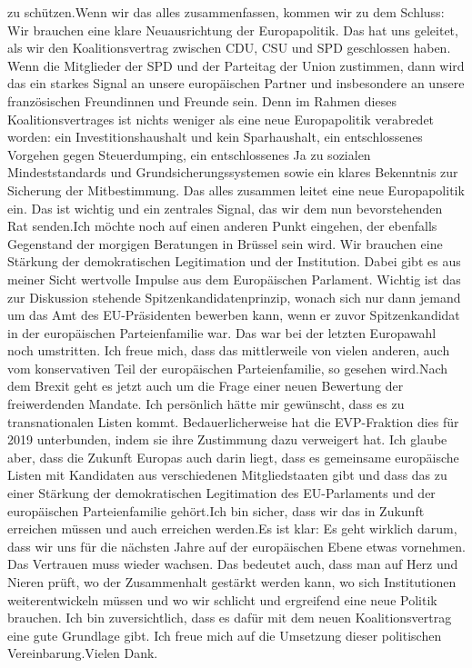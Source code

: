 \documentclass{article}
\begin{document}
zu schützen.Wenn wir das alles zusammenfassen, kommen wir zu dem Schluss: Wir brauchen eine klare Neuausrichtung der Europapolitik. Das hat uns geleitet, als wir den Koalitionsvertrag zwischen CDU, CSU und SPD geschlossen haben. Wenn die Mitglieder der SPD und der Parteitag der Union zustimmen, dann wird das ein starkes Signal an unsere europäischen Partner und insbesondere an unsere französischen Freundinnen und Freunde sein. Denn im Rahmen dieses Koalitionsvertrages ist nichts weniger als eine neue Europapolitik verabredet worden: ein Investitionshaushalt und kein Sparhaushalt, ein entschlossenes Vorgehen gegen Steuerdumping, ein entschlossenes Ja zu sozialen Mindeststandards und Grundsicherungssystemen sowie ein klares Bekenntnis zur Sicherung der Mitbestimmung. Das alles zusammen leitet eine neue Europapolitik ein. Das ist wichtig und ein zentrales Signal, das wir dem nun bevorstehenden Rat senden.Ich möchte noch auf einen anderen Punkt eingehen, der ebenfalls Gegenstand der morgigen Beratungen in Brüssel sein wird. Wir brauchen eine Stärkung der demokratischen Legitimation und der Institution. Dabei gibt es aus meiner Sicht wertvolle Impulse aus dem Europäischen Parlament. Wichtig ist das zur Diskussion stehende Spitzenkandidatenprinzip, wonach sich nur dann jemand um das Amt des EU-Präsidenten bewerben kann, wenn er zuvor Spitzenkandidat in der europäischen Parteienfamilie war. Das war bei der letzten Europawahl noch umstritten. Ich freue mich, dass das mittlerweile von vielen anderen, auch vom konservativen Teil der europäischen Parteienfamilie, so gesehen wird.Nach dem Brexit geht es jetzt auch um die Frage einer neuen Bewertung der freiwerdenden Mandate. Ich persönlich hätte mir gewünscht, dass es zu transnationalen Listen kommt. Bedauerlicherweise hat die EVP-Fraktion dies für 2019 unterbunden, indem sie ihre Zustimmung dazu verweigert hat. Ich glaube aber, dass die Zukunft Europas auch darin liegt, dass es gemeinsame europäische Listen mit Kandidaten aus verschiedenen Mitgliedstaaten gibt und dass das zu einer Stärkung der demokratischen Legitimation des EU-Parlaments und der europäischen Parteienfamilie gehört.Ich bin sicher, dass wir das in Zukunft erreichen müssen und auch erreichen werden.Es ist klar: Es geht wirklich darum, dass wir uns für die nächsten Jahre auf der europäischen Ebene etwas vornehmen. Das Vertrauen muss wieder wachsen. Das bedeutet auch, dass man auf Herz und Nieren prüft, wo der Zusammenhalt gestärkt werden kann, wo sich Institutionen weiterentwickeln müssen und wo wir schlicht und ergreifend eine neue Politik brauchen. Ich bin zuversichtlich, dass es dafür mit dem neuen Koalitionsvertrag eine gute Grundlage gibt. Ich freue mich auf die Umsetzung dieser politischen Vereinbarung.Vielen Dank.
\end{document}
